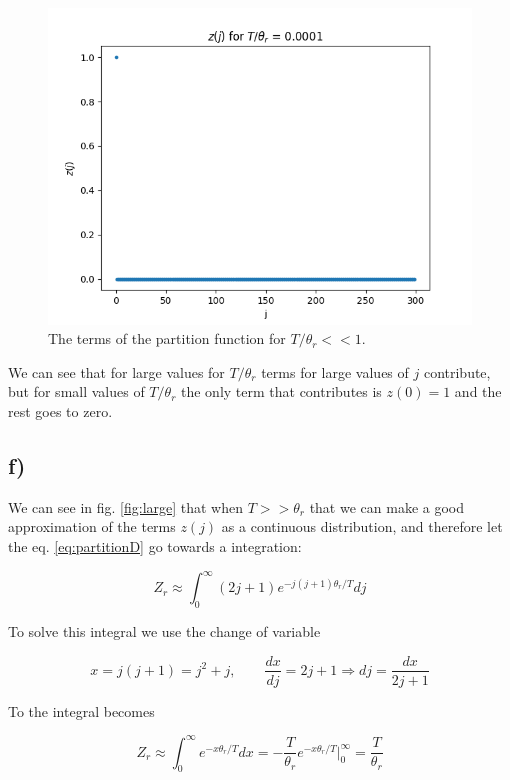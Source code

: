 \documentclass[a4paper,norsk, 10pt]{article}
\begin{document}
\begin{figure}[H]
\centering
\includegraphics[scale=0.5]{e_liten.png}
\caption{The terms of the partition function for $T/\theta_r << 1$.}
\end{figure}\label{fig:small}

We can see that for large values for $T/\theta_r$ terms for large values of $j$ contribute, but for small values of $T/\theta_r$  the only term that contributes is $z(0) = 1$ and the rest goes to zero.


\subsection{f)}
We can see in fig. \ref{fig:large} that when $T >> \theta_r$ that we can make a good approximation of the terms $z(j)$ as a continuous distribution, and therefore let the eq. \eqref{eq:partitionD} go towards a integration:

\begin{equation}
Z_r \approx \int_0^\infty (2j + 1) e^{-j(j+1)\theta_r/T} dj
\end{equation}

To solve this integral we use the change of variable

\begin{equation}
x = j(j+1) = j^2 + j, \qquad \frac{dx}{dj} = 2j + 1 \Rightarrow dj = \frac{dx}{2j+1}
\end{equation}

To the integral becomes

\begin{equation}
Z_r \approx \int_0^\infty e^{-x\theta_r/T} dx = -\frac{T}{\theta_r}e^{-x\theta_r/T} \bigg|_0^\infty = \frac{T}{\theta_r}
\end{equation}
\end{document}
